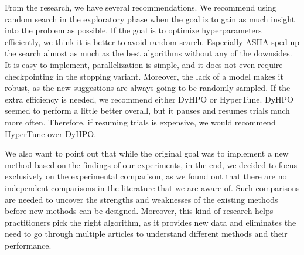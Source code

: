 From the research, we have several recommendations. We recommend using random search in the exploratory phase when the goal is to gain as much insight into the problem as possible. If the goal is to optimize hyperparameters efficiently, we think it is better to avoid random search. Especially ASHA sped up the search almost as much as the best algorithms without any of the downsides. It is easy to implement, parallelization is simple, and it does not even require checkpointing in the stopping variant. Moreover, the lack of a model makes it robust, as the new suggestions are always going to be randomly sampled. If the extra efficiency is needed, we recommend either DyHPO or HyperTune. DyHPO seemed to perform a little better overall, but it pauses and resumes trials much more often. Therefore, if resuming trials is expensive, we would recommend HyperTune over DyHPO.\@

We also want to point out that while the original goal was to implement a new method based on the findings of our experiments, in the end, we decided to focus exclusively on the experimental comparison, as we found out that there are no independent comparisons in the literature that we are aware of. Such comparisons are needed to uncover the strengths and weaknesses of the existing methods before new methods can be designed. Moreover, this kind of research helps practitioners pick the right algorithm, as it provides new data and eliminates the need to go through multiple articles to understand different methods and their performance.


